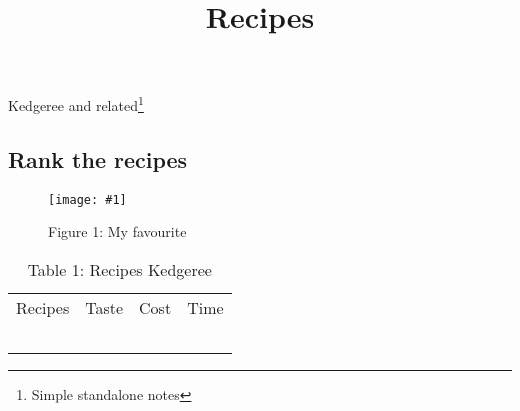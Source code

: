 \documentclass{article}
\newlength{\imgwidth}
\newcommand\scaledgraphics[2]{%
                
\settowidth{\imgwidth}{\texttt{[image: \#1]}}%
                
\setlength{\imgwidth}{\minof{\imgwidth}{#2\textwidth}}%
                
\texttt{[image: \#1]}%
                
}
\begin{document}
\title{Recipes}

\maketitle


Kedgeree and related\footnote{Simple standalone notes}


\autocite{gesis-ssoar-28542}


\subsection{Rank the recipes}\label{H7810746}


\begin{figure}
\scaledgraphics{ea892ad3-f5cd-4942-879b-a7fb578387cd.jpg}{1}
\caption*{Figure 1: My favourite}\label{F95930561}
\end{figure}

\begin{table}
\caption*{Table 1: Recipes Kedgeree}\label{T27840311}

\begin{tabu} to \textwidth { |X|X|X|X| }
\hline



Recipes & Taste & Cost & Time
 \\


 &  &  & 
 \\


 &  &  & 
 \\


 &  &  & 
 \\


 &  &  & 
 \\


 &  &  & 
 \\
\hline

\end{tabu}\end{table}





\printbibliography[title={Bibliography}]
\end{document}
